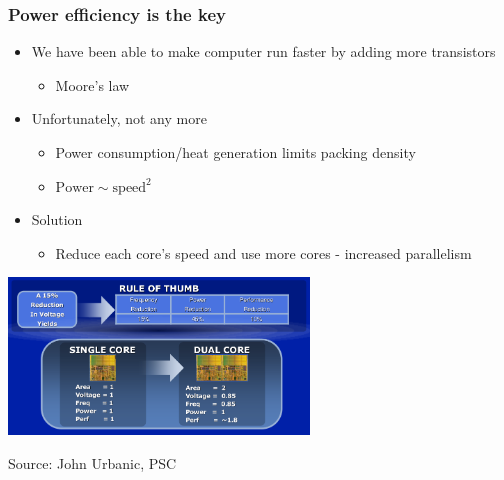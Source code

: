 \documentclass[10pt,t]{beamer}
\begin{document}
\begin{frame}
  \frametitle{Power efficiency is the key}
  \begin{itemize}
  \item We have been able to make computer run faster by adding more transistors
    \begin{itemize}
    \item Moore's law
    \end{itemize}
  \item Unfortunately, not any more
    \begin{itemize}
    \item Power consumption/heat generation limits packing density
    \item $\mathrm{Power} \sim \mathrm{speed}^2$
    \end{itemize}
  \item Solution
    \begin{itemize}
    \item Reduce each core's speed and use more cores - increased
      parallelism
    \end{itemize}
  \end{itemize}
  \begin{center}
    \includegraphics[width=0.6\textwidth]{./cpucore}
    
    \tiny{Source: John Urbanic, PSC}
  \end{center}
\end{frame}
\end{document}
